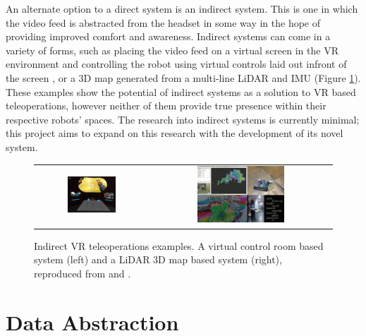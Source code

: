 An alternate option to a direct system is an indirect system. This is one in which the video feed is abstracted from the headset in some way in the hope of providing improved comfort and awareness. Indirect systems can come in a variety of forms, such as placing the video feed on a virtual screen in the VR environment and controlling the robot using virtual controls laid out infront of the screen \cite{lipton2018baxter}, or a 3D map generated from a multi-line LiDAR and IMU \cite{wang2017novel} (Figure \ref{fig:VRTele}). These examples show the potential of indirect systems as a solution to VR based teleoperations, however neither of them provide true presence within their respective robots' spaces. The research into indirect systems is currently minimal; this project aims to expand on this research with the development of its novel system.

\begin{figure}[H]
    \begin{center}
    \begin{tabular}{ c c }
        \includegraphics[width=0.45\textwidth]{Figures/homun.png} &
        \includegraphics[width=0.5\textwidth]{Figures/lidar.png}
    \end{tabular}
    \caption[Indirect VR teleoperations examples]{Indirect VR teleoperations examples. A virtual control room based system (left) and a LiDAR 3D map based system (right), reproduced from \cite{lipton2018baxter} and \cite{wang2017novel}.}
    \label{fig:VRTele}
    \end{center}
\end{figure}

\section{Data Abstraction}
\label{Subsection:abstract}

